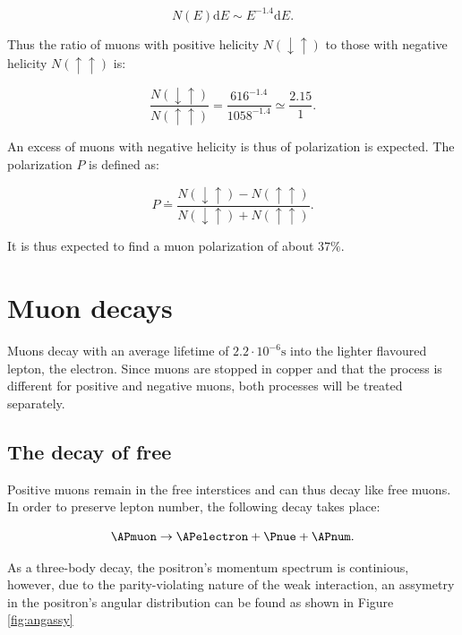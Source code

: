 \begin{equation}
N(E) \mathrm{d}E \sim E^{-1.4}\mathrm{d} E.
\end{equation}

Thus the ratio of muons with positive helicity $N(\downarrow\uparrow)$ to those with negative helicity $N(\uparrow\uparrow)$ is:

\begin{equation}
\frac{N(\downarrow\uparrow)}{N(\uparrow\uparrow)}=\frac{616^{-1.4}}{1058^{-1.4}}\simeq \frac{2.15}{1}.
\end{equation}

An excess of muons with negative helicity is thus of polarization is expected. The polarization $P$ is defined as:

\begin{equation}
P\doteq \frac{N(\downarrow\uparrow)-N(\uparrow\uparrow)}{N(\downarrow\uparrow)+N(\uparrow\uparrow)}.
\end{equation}

It is thus expected to find a muon polarization of about $37\%$.

\section{Muon decays}

Muons decay with an average lifetime of $2.2 \cdot 10^{-6}\si{\second}$ into the lighter flavoured lepton, the electron. Since muons are stopped in copper and that the process is different for positive and negative muons, both processes will be treated separately.

\subsection{The decay of free \APmuon}

Positive muons remain in the free interstices and can thus decay like free muons. In order to preserve lepton number, the following decay takes place:

\begin{equation*}
\APmuon \rightarrow \APelectron + \Pnue + \APnum.
\end{equation*}

As a three-body decay, the positron's momentum spectrum is continious, however, due to the parity-violating nature of the weak interaction, an assymetry in the positron's angular distribution can be found as shown in Figure \ref{fig:angassy}


